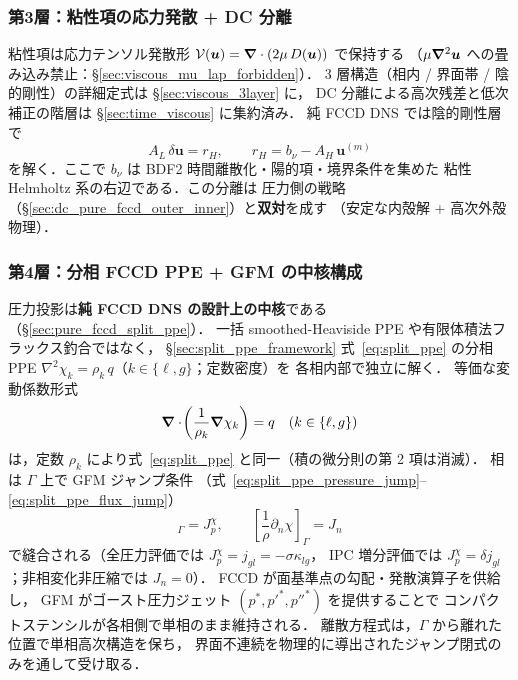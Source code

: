\subsubsection{第3層：粘性項の応力発散 + DC 分離}
\label{sec:pure_fccd_phase3}

粘性項は応力テンソル発散形 $\mathcal{V}(\bm{u}) = \bm{\nabla}\cdot(2\mu\,D(\bm{u}))$ で保持する
（$\mu\bm{\nabla}^2\bm{u}$ への畳み込み禁止：§\ref{sec:viscous_mu_lap_forbidden}）．
3 層構造（相内 / 界面帯 / 陰的剛性）の詳細定式は §\ref{sec:viscous_3layer} に，
DC 分離による高次残差と低次補正の階層は §\ref{sec:time_viscous} に集約済み．
純 FCCD DNS では陰的剛性層で
\begin{equation}
  A_L\,\delta\mathbf{u} = r_H,
  \qquad r_H = b_\nu - A_H\,\mathbf{u}^{(m)}
  \label{eq:pure_fccd_viscous_dc}
\end{equation}
を解く．ここで $b_\nu$ は BDF2 時間離散化・陽的項・境界条件を集めた
粘性 Helmholtz 系の右辺である．この分離は
圧力側の戦略（§\ref{sec:dc_pure_fccd_outer_inner}）と\textbf{双対}を成す
（安定な内殻解 + 高次外殻物理）．

\subsubsection{第4層：分相 FCCD PPE + GFM の中核構成}
\label{sec:pure_fccd_phase4}

圧力投影は\textbf{純 FCCD DNS の設計上の中核}である（§\ref{sec:pure_fccd_split_ppe}）．
一括 smoothed-Heaviside PPE や有限体積法フラックス釣合ではなく，
§\ref{sec:split_ppe_framework} 式~\eqref{eq:split_ppe} の分相 PPE
$\nabla^2 \chi_k = \rho_k\, q$（$k\in\{\ell,g\}$；定数密度）を
各相内部で独立に解く．
等価な変動係数形式
\begin{equation}
  \bm{\nabla}\cdot\!\left(\frac{1}{\rho_k}\bm{\nabla} \chi_k\right) = q
  \quad (k\in\{\ell,g\})
  \label{eq:pure_fccd_split_ppe_core}
\end{equation}
は，定数 $\rho_k$ により式~\eqref{eq:split_ppe} と同一（積の微分則の第 2 項は消滅）．
相は $\Gamma$ 上で GFM ジャンプ条件
（式~\eqref{eq:split_ppe_pressure_jump}--\eqref{eq:split_ppe_flux_jump}）
\begin{equation}
  [\chi]_\Gamma = J_p^\chi,
  \qquad
  \left[\frac{1}{\rho}\partial_n \chi\right]_\Gamma = J_n
  \label{eq:pure_fccd_gfm_jump}
\end{equation}
で縫合される（全圧力評価では $J_p^\chi=j_{gl}=-\sigma\kappa_{lg}$，
IPC 増分評価では $J_p^\chi=\delta j_{gl}$；非相変化非圧縮では $J_n=0$）．
FCCD が面基準点の勾配・発散演算子を供給し，
GFM がゴースト圧力ジェット $(p^*,p'^*,p''^*)$ を提供することで
コンパクトステンシルが各相側で単相のまま維持される．
離散方程式は，$\Gamma$ から離れた位置で単相高次構造を保ち，
界面不連続を物理的に導出されたジャンプ閉式のみを通して受け取る．

